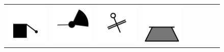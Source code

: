 \documentclass[doc]{apa6}
\newcommand{\stimulusscale}{.1}
\begin{document}
\begin{figure}[t]
\begin{center}
\begin{tabular}{c|cccccccc}
\includegraphics[scale=\stimulusscale]{./set22stim55.png} &
\includegraphics[scale=\stimulusscale]{./set23stim55.png} &
\includegraphics[scale=\stimulusscale]{./set24stim55.png} &
\includegraphics[scale=\stimulusscale]{./set25stim55.png} &

\end{tabular}
\end{center}
\end{figure}
\end{document}

